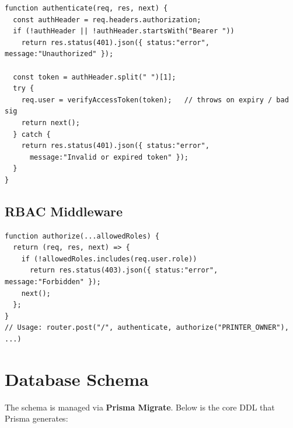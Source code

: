 \documentclass[12pt,a4paper]{report}
\begin{document}
\begin{lstlisting}[style=jsStyle, caption={JWT authenticate middleware}]
function authenticate(req, res, next) {
  const authHeader = req.headers.authorization;
  if (!authHeader || !authHeader.startsWith("Bearer "))
    return res.status(401).json({ status:"error", message:"Unauthorized" });

  const token = authHeader.split(" ")[1];
  try {
    req.user = verifyAccessToken(token);   // throws on expiry / bad sig
    return next();
  } catch {
    return res.status(401).json({ status:"error",
      message:"Invalid or expired token" });
  }
}
\end{lstlisting}

\subsection{RBAC Middleware}

\begin{lstlisting}[style=jsStyle, caption={Role-based access control middleware}]
function authorize(...allowedRoles) {
  return (req, res, next) => {
    if (!allowedRoles.includes(req.user.role))
      return res.status(403).json({ status:"error", message:"Forbidden" });
    next();
  };
}
// Usage: router.post("/", authenticate, authorize("PRINTER_OWNER"), ...)
\end{lstlisting}

\section{Database Schema}

The schema is managed via \textbf{Prisma Migrate}. Below is the core DDL that Prisma
generates:
\end{document}
